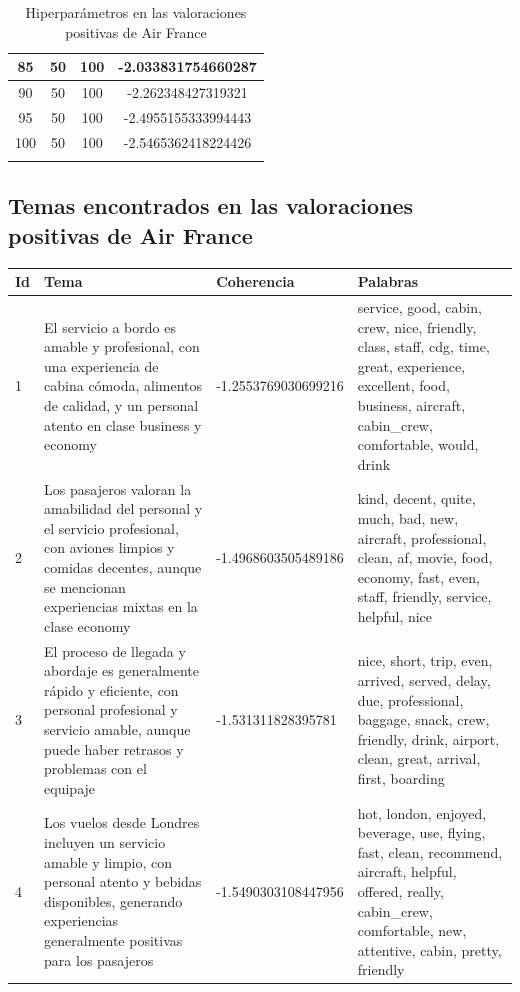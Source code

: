 \documentclass{report}
\begin{document}
{\begin{longtable}{|c|c|c|c|}
                    85 & 50 & 100 & -2.033831754660287 \\
                    \hline
                    90 & 50 & 100 & -2.262348427319321 \\
                    \hline
                    95 & 50 & 100 & -2.4955155333994443 \\
                    \hline
                    100 & 50 & 100 & -2.5465362418224426 \\
                    \hline
                    \caption{Hiperparámetros en las valoraciones positivas de Air France}
                \end{longtable}
            \clearpage\subsection{Temas encontrados en las valoraciones positivas de Air France}
                \label{tab:temas_air_france_positivas}
                \begin{longtable}{|p{1cm}|p{4cm}|p{4cm}|p{6cm}|}
                    \hline
                    \textbf{Id} & \textbf{Tema} & \textbf{Coherencia} & \textbf{Palabras} \\
                    \hline
                    1 & El servicio a bordo es amable y profesional, con una experiencia de cabina cómoda, alimentos de calidad, y un personal atento en clase business y economy & -1.2553769030699216 & service, good, cabin, crew, nice, friendly, class, staff, cdg, time, great, experience, excellent, food, business, aircraft, cabin\_crew, comfortable, would, drink \\
                    \hline
                    2 & Los pasajeros valoran la amabilidad del personal y el servicio profesional, con aviones limpios y comidas decentes, aunque se mencionan experiencias mixtas en la clase economy & -1.4968603505489186 & kind, decent, quite, much, bad, new, aircraft, professional, clean, af, movie, food, economy, fast, even, staff, friendly, service, helpful, nice \\
                    \hline
                    3 & El proceso de llegada y abordaje es generalmente rápido y eficiente, con personal profesional y servicio amable, aunque puede haber retrasos y problemas con el equipaje & -1.531311828395781 & nice, short, trip, even, arrived, served, delay, due, professional, baggage, snack, crew, friendly, drink, airport, clean, great, arrival, first, boarding \\
                    \hline
                    4 & Los vuelos desde Londres incluyen un servicio amable y limpio, con personal atento y bebidas disponibles, generando experiencias generalmente positivas para los pasajeros & -1.5490303108447956 & hot, london, enjoyed, beverage, use, flying, fast, clean, recommend, aircraft, helpful, offered, really, cabin\_crew, comfortable, new, attentive, cabin, pretty, friendly \\

\end{longtable}}
\end{document}
